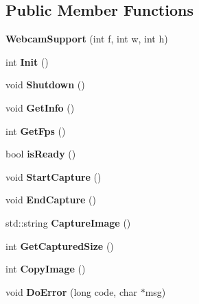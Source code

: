 \subsection*{Public Member Functions}
\begin{DoxyCompactItemize}
\item 
{\bfseries Webcam\+Support} (int f, int w, int h)\hypertarget{classWebcamSupport_a7e0b92ca6e505f8894151228cc96b7b0}{}\label{classWebcamSupport_a7e0b92ca6e505f8894151228cc96b7b0}

\item 
int {\bfseries Init} ()\hypertarget{classWebcamSupport_a9203fee2b3942c6cc3a5744a080a9c9f}{}\label{classWebcamSupport_a9203fee2b3942c6cc3a5744a080a9c9f}

\item 
void {\bfseries Shutdown} ()\hypertarget{classWebcamSupport_a6adc14e0c882a23be51e418afb67e5f0}{}\label{classWebcamSupport_a6adc14e0c882a23be51e418afb67e5f0}

\item 
void {\bfseries Get\+Info} ()\hypertarget{classWebcamSupport_a0f51eb33a6d111f5622711ec31a99df9}{}\label{classWebcamSupport_a0f51eb33a6d111f5622711ec31a99df9}

\item 
int {\bfseries Get\+Fps} ()\hypertarget{classWebcamSupport_ac9d4c179d421c8970f0320cd2950e6df}{}\label{classWebcamSupport_ac9d4c179d421c8970f0320cd2950e6df}

\item 
bool {\bfseries is\+Ready} ()\hypertarget{classWebcamSupport_aeb410a8241fc69a784c0019b1f69e3f6}{}\label{classWebcamSupport_aeb410a8241fc69a784c0019b1f69e3f6}

\item 
void {\bfseries Start\+Capture} ()\hypertarget{classWebcamSupport_a25b28798e092445a948c8288f012aada}{}\label{classWebcamSupport_a25b28798e092445a948c8288f012aada}

\item 
void {\bfseries End\+Capture} ()\hypertarget{classWebcamSupport_a99d13e8bd33dec19819128377fe6efb4}{}\label{classWebcamSupport_a99d13e8bd33dec19819128377fe6efb4}

\item 
std\+::string {\bfseries Capture\+Image} ()\hypertarget{classWebcamSupport_ae095f89d8ec477bd9450addd49e6aab0}{}\label{classWebcamSupport_ae095f89d8ec477bd9450addd49e6aab0}

\item 
int {\bfseries Get\+Captured\+Size} ()\hypertarget{classWebcamSupport_a3e5fe137a3c7d5518910f639301ee57f}{}\label{classWebcamSupport_a3e5fe137a3c7d5518910f639301ee57f}

\item 
int {\bfseries Copy\+Image} ()\hypertarget{classWebcamSupport_a2f5a772f6b9b613fef95670c45e83e6f}{}\label{classWebcamSupport_a2f5a772f6b9b613fef95670c45e83e6f}

\item 
void {\bfseries Do\+Error} (long code, char $\ast$msg)\hypertarget{classWebcamSupport_a1e34fe7b04a43cbcf00f83a4a357a6c8}{}\label{classWebcamSupport_a1e34fe7b04a43cbcf00f83a4a357a6c8}

\end{DoxyCompactItemize}
